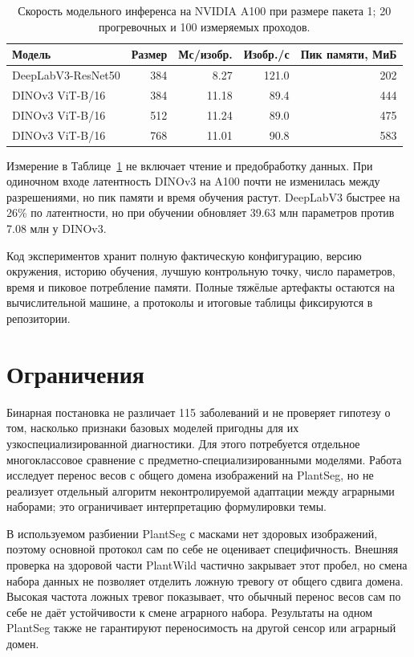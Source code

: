 \documentclass[a4paper,12pt]{extarticle}
\begin{document}
\begin{table}[ht]
  \caption{Скорость модельного инференса на NVIDIA A100 при размере пакета 1;
  20 прогревочных и 100 измеряемых проходов.}
  \label{tab:compute}
  \centering
  \small
  \begin{tabular}{lrrrr}
    \toprule
    Модель & Размер & Мс/изобр. & Изобр./с & Пик памяти, МиБ \\
    \midrule
    DeepLabV3-ResNet50 & 384 & 8.27 & 121.0 & 202 \\
    DINOv3 ViT-B/16 & 384 & 11.18 & 89.4 & 444 \\
    DINOv3 ViT-B/16 & 512 & 11.24 & 89.0 & 475 \\
    DINOv3 ViT-B/16 & 768 & 11.01 & 90.8 & 583 \\
    \bottomrule
  \end{tabular}
\end{table}

Измерение в Таблице~\ref{tab:compute} не включает чтение и предобработку данных.
При одиночном входе латентность DINOv3 на A100 почти не изменилась между
разрешениями, но пик памяти и время обучения растут. DeepLabV3 быстрее
на 26\% по латентности, но при обучении обновляет 39.63 млн параметров против
7.08 млн у DINOv3.

Код экспериментов хранит полную фактическую конфигурацию, версию окружения, историю
обучения, лучшую контрольную точку, число параметров, время и пиковое потребление
памяти. Полные тяжёлые артефакты остаются на вычислительной машине, а протоколы
и итоговые таблицы фиксируются в репозитории.

\clearpage
\section{Ограничения}

Бинарная постановка не различает 115 заболеваний и не проверяет гипотезу о том,
насколько признаки базовых моделей пригодны для их узкоспециализированной
диагностики. Для этого потребуется отдельное многоклассовое сравнение с
предметно-специализированными моделями. Работа исследует перенос весов с общего
домена изображений на PlantSeg, но не реализует отдельный алгоритм
неконтролируемой адаптации между аграрными наборами; это ограничивает
интерпретацию формулировки темы.

В используемом разбиении PlantSeg с масками нет здоровых изображений, поэтому
основной протокол сам по себе не оценивает специфичность. Внешняя проверка на
здоровой части PlantWild частично закрывает этот пробел, но смена набора данных
не позволяет отделить ложную тревогу от общего сдвига домена. Высокая частота
ложных тревог показывает, что обычный перенос весов сам по себе не даёт
устойчивости к смене аграрного набора. Результаты на одном PlantSeg также не
гарантируют переносимость на другой сенсор или аграрный домен.
\end{document}
